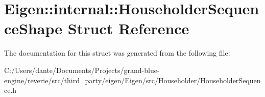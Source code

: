 \hypertarget{struct_eigen_1_1internal_1_1_householder_sequence_shape}{}\section{Eigen\+::internal\+::Householder\+Sequence\+Shape Struct Reference}
\label{struct_eigen_1_1internal_1_1_householder_sequence_shape}


The documentation for this struct was generated from the following file\+:\begin{DoxyCompactItemize}
\item 
C\+:/\+Users/dante/\+Documents/\+Projects/grand-\/blue-\/engine/reverie/src/third\+\_\+party/eigen/\+Eigen/src/\+Householder/Householder\+Sequence.\+h\end{DoxyCompactItemize}
